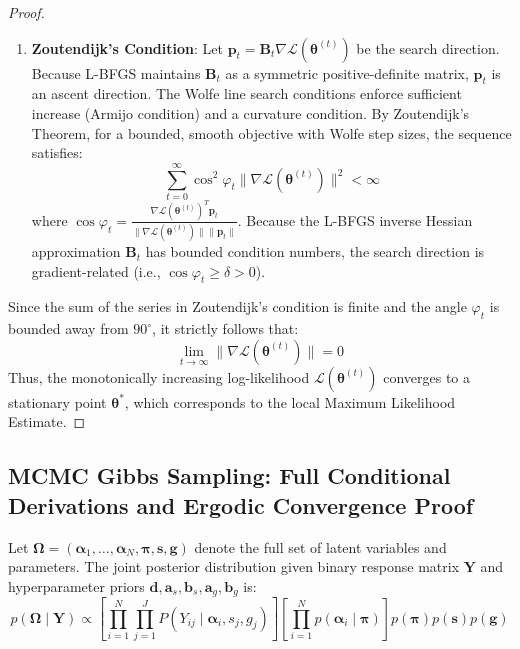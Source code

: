 \documentclass[11pt,a4paper]{article}
\begin{document}
\begin{proof}
\begin{enumerate}
    \item \textbf{Zoutendijk's Condition}: 
    Let $\mathbf{p}_t = \mathbf{B}_t \nabla \mathcal{L}(\boldsymbol{\theta}^{(t)})$ be the search direction. Because L-BFGS maintains $\mathbf{B}_t$ as a symmetric positive-definite matrix, $\mathbf{p}_t$ is an ascent direction. The Wolfe line search conditions enforce sufficient increase (Armijo condition) and a curvature condition. By Zoutendijk's Theorem, for a bounded, smooth objective with Wolfe step sizes, the sequence satisfies:
    \begin{equation}
    \sum_{t=0}^\infty \cos^2 \varphi_t \|\nabla \mathcal{L}(\boldsymbol{\theta}^{(t)})\|^2 < \infty
    \end{equation}
    where $\cos \varphi_t = \frac{\nabla \mathcal{L}(\boldsymbol{\theta}^{(t)})^T \mathbf{p}_t}{\|\nabla \mathcal{L}(\boldsymbol{\theta}^{(t)})\| \|\mathbf{p}_t\|}$. Because the L-BFGS inverse Hessian approximation $\mathbf{B}_t$ has bounded condition numbers, the search direction is gradient-related (i.e., $\cos \varphi_t \ge \delta > 0$).
\end{enumerate}

Since the sum of the series in Zoutendijk's condition is finite and the angle $\varphi_t$ is bounded away from $90^\circ$, it strictly follows that:
\begin{equation}
\lim_{t \to \infty} \|\nabla \mathcal{L}(\boldsymbol{\theta}^{(t)})\| = 0
\end{equation}
Thus, the monotonically increasing log-likelihood $\mathcal{L}(\boldsymbol{\theta}^{(t)})$ converges to a stationary point $\boldsymbol{\theta}^*$, which corresponds to the local Maximum Likelihood Estimate.
\end{proof}








\subsection{MCMC Gibbs Sampling: Full Conditional Derivations and Ergodic Convergence Proof}

Let $\boldsymbol{\Omega} = (\boldsymbol{\alpha}_1, \dots, \boldsymbol{\alpha}_N, \boldsymbol{\pi}, \mathbf{s}, \mathbf{g})$ denote the full set of latent variables and parameters. The joint posterior distribution given binary response matrix $\mathbf{Y}$ and hyperparameter priors $\mathbf{d}, \mathbf{a}_s, \mathbf{b}_s, \mathbf{a}_g, \mathbf{b}_g$ is:
\begin{equation}
p(\boldsymbol{\Omega} \mid \mathbf{Y}) \propto \left[ \prod_{i=1}^N \prod_{j=1}^J P(Y_{ij} \mid \boldsymbol{\alpha}_i, s_j, g_j) \right] \left[ \prod_{i=1}^N p(\boldsymbol{\alpha}_i \mid \boldsymbol{\pi}) \right] p(\boldsymbol{\pi}) p(\mathbf{s}) p(\mathbf{g})
\end{equation}
\end{document}
